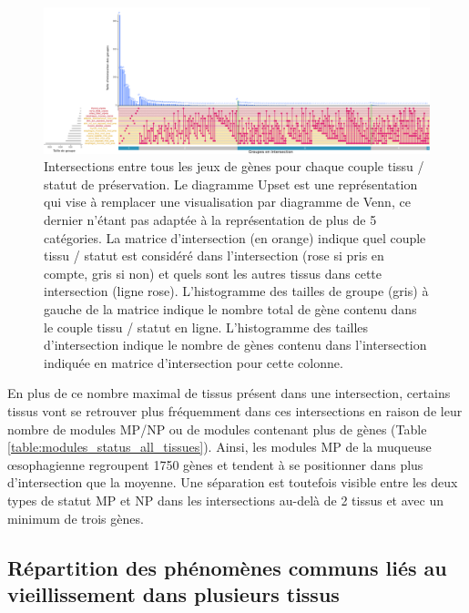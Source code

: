 \begin{landscape}
\begin{figure}[p]
  \centering
  \includegraphics[width=1.5\textheight]{img/chap2/chap2_upset_genes_unpres_modpres_by_tissue.pdf}
  \caption[Intersections entre tous les jeux de gènes pour chaque couple tissu / statut de préservation]{Intersections entre tous les jeux de gènes pour chaque couple tissu / statut de préservation. Le diagramme Upset est une représentation qui vise à remplacer une visualisation par diagramme de Venn, ce dernier n'étant pas adaptée à la représentation de plus de 5 catégories. La matrice d'intersection (en orange) indique quel couple tissu / statut est considéré dans l'intersection (rose si pris en compte, gris si non) et quels sont les autres tissus dans cette intersection (ligne rose). L'histogramme des tailles de groupe (gris) à gauche de la matrice indique le nombre total de gène contenu dans le couple tissu / statut en ligne. L'histogramme des tailles d'intersection indique le nombre de gènes contenu dans l'intersection indiquée en matrice d'intersection pour cette colonne.}
  \label{figure:upset_intersection_genes_tissu_unpres_modpres}
\end{figure}
\end{landscape}

En plus de ce nombre maximal de tissus présent dans une intersection, certains tissus vont se retrouver plus fréquemment dans ces intersections en raison de leur nombre de modules MP/NP ou de modules contenant plus de gènes (Table \ref{table:modules_status_all_tissues}). Ainsi, les modules MP de la muqueuse œsophagienne regroupent 1750 gènes et tendent à se positionner dans plus d'intersection que la moyenne. Une séparation est toutefois visible entre les deux types de statut MP et NP dans les intersections au-delà de 2 tissus et avec un minimum de trois gènes.


\subsection{Répartition des phénomènes communs liés au vieillissement dans plusieurs tissus}

